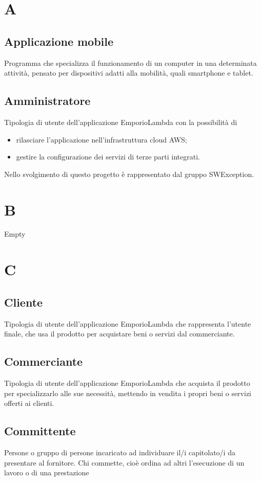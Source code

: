 \section*{A}
\subsection*{Applicazione mobile}
Programma che specializza il funzionamento di un computer in una determinata attività,
pensato per dispositivi adatti alla mobilità, quali smartphone e tablet.

\subsection*{Amministratore}
Tipologia di utente dell'applicazione EmporioLambda con la possibilità di
\begin{itemize}
    \item rilasciare l'applicazione nell'infrastruttura cloud AWS;
    \item gestire la configurazione dei servizi di terze parti integrati.
\end{itemize}
Nello svolgimento di questo progetto è rappresentato dal gruppo SWException.

\section*{B}
Empty

\section*{C}
\subsection*{Cliente}
Tipologia di utente dell'applicazione EmporioLambda che rappresenta l'utente finale, che usa
il prodotto per acquistare beni o servizi dal commerciante.

\subsection*{Commerciante}
Tipologia di utente dell'applicazione EmporioLambda che acquista il prodotto per specializzarlo
alle sue necessità, mettendo in vendita i propri beni o servizi offerti ai clienti.

\subsection*{Committente}
Persone o gruppo di persone incaricato ad individuare il/i capitolato/i da presentare al fornitore.
Chi commette, cioè ordina ad altri l'esecuzione di un lavoro o di una prestazione



